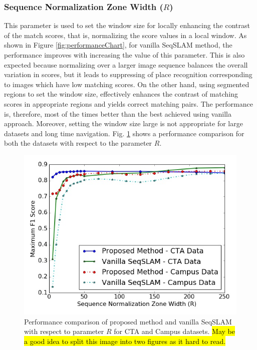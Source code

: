 \documentclass[letterpaper, 10 pt, conference]{ieeeconf}  %
\begin{document}
\subsubsection{Sequence Normalization Zone Width ($R$)}
This parameter is used to set the window size for locally enhancing the contrast of the match scores, that is, normalizing the score values in a local window. As shown in Figure \ref{fig:performanceChart}, for vanilla SeqSLAM method, the performance improves with increasing the value of this parameter. This is also expected because normalizing over a larger image sequence balances the overall variation in scores, but it leads to suppressing of place recognition corresponding to images which have low matching scores. On the other hand, using segmented regions to set the window size, effectively enhances the contrast of matching scores in appropriate regions and yields correct matching pairs. The performance is, therefore, most of the times better than the best achieved using vanilla approach. Moreover, setting the window size large is not appropriate for large datasets and long time navigation. Fig. \ref{fig:RPerformance} shows a performance comparison for both the datasets with respect to the parameter $R$.

\begin{figure}
 \includegraphics[scale=0.4]{RPerformance}
 \caption{Performance comparison of proposed method and vanilla SeqSLAM with respect to parameter $R$ for CTA and Campus datasets. \hl{May be a good idea to split this image into two figures as it hard to read. }}
 \label{fig:RPerformance}
\end{figure}
\end{document}
